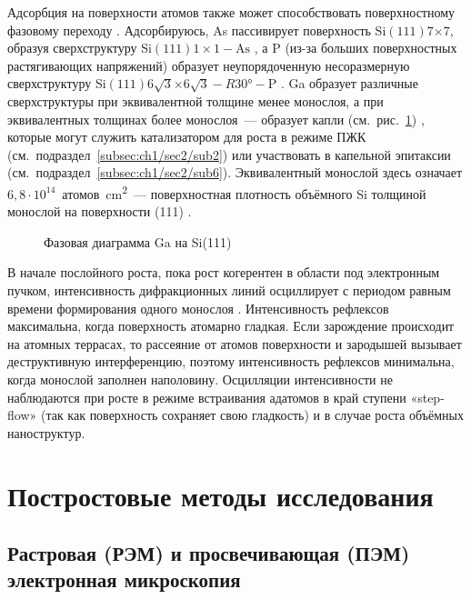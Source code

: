 Адсорбция на поверхности атомов также может способствовать поверхностному
фазовому переходу \cite{Bringans1993, Ji2007}. Адсорбируюсь, As пассивирует
поверхность Si\((111)7\)\(\times\)\(7\), образуя сверхструктуру
Si\((111)1\times1-\text{As}\) \cite{Patel1989, Bringans1992}, а P (из-за
больших поверхностных растягивающих напряжений) образует неупорядоченную
несоразмерную сверхструктуру
Si\((111)6\sqrt{3}\)\(\times\)\(6\sqrt{3}-R30\si{\degree}-\text{P}\)
\cite{Vitali1998, Siriwardena2017}. Ga образует различные сверхструктуры при
эквивалентной толщине менее монослоя, а при эквивалентных толщинах более
монослоя~--- образует капли (см.~рис.~\cref{fig:Image_12}) \cite{Park1988},
которые могут служить катализатором для роста в режиме ПЖК
(см.~подраздел~\cref{subsec:ch1/sec2/sub2}) или участвовать в капельной
эпитаксии (см.~подраздел~\cref{subsec:ch1/sec2/sub6}). Эквивалентный монослой
здесь означает \(6,8 \cdot 10^{14}\)~атомов\si{\per\centi\meter^{2}}~---
поверхностная плотность объёмного Si толщиной монослой на поверхности (111)
\cite{Kumar2010}.

\begin{figure}[ht]  \caption{Фазовая диаграмма Ga
на Si(111) \cite{Park1988}}\label{fig:Image_12} \end{figure}

В начале послойного роста, пока рост когерентен в области под электронным
пучком, интенсивность дифракционных линий осциллирует с периодом равным времени
формирования одного монослоя \cite{Harris1981}. Интенсивность рефлексов
максимальна, когда поверхность атомарно гладкая. Если зарождение происходит на
атомных террасах, то рассеяние от атомов поверхности и зародышей вызывает
деструктивную интерференцию, поэтому интенсивность рефлексов минимальна, когда
монослой заполнен наполовину. Осцилляции интенсивности не наблюдаются при росте
в режиме встраивания адатомов в край ступени «step-flow» (так как поверхность
сохраняет свою гладкость) и в случае роста объёмных наноструктур.

\section{Постростовые методы исследования}\label{sec:ch2/sec2}

\subsection{Растровая (РЭМ) и просвечивающая (ПЭМ) электронная
микроскопия}\label{subsec:ch2/sec2/sub1}

